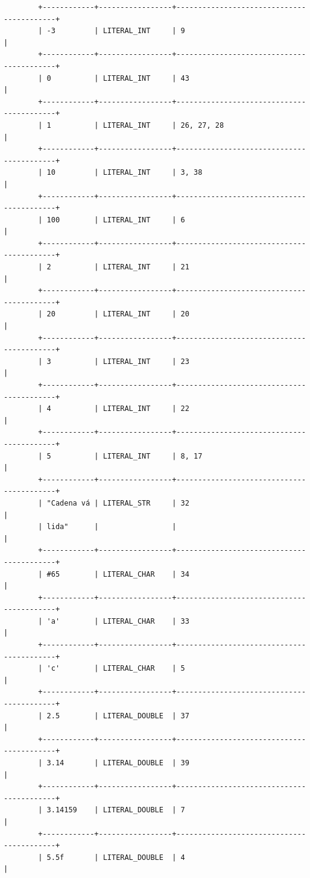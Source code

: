\documentclass[a4paper,12pt]{article}
\begin{document}
\begin{flushleft}
\begin{verbatim}
		+------------+-----------------+------------------------------------------+
		| -3         | LITERAL_INT     | 9                                        |
		+------------+-----------------+------------------------------------------+
		| 0          | LITERAL_INT     | 43                                       |
		+------------+-----------------+------------------------------------------+
		| 1          | LITERAL_INT     | 26, 27, 28                               |
		+------------+-----------------+------------------------------------------+
		| 10         | LITERAL_INT     | 3, 38                                    |
		+------------+-----------------+------------------------------------------+
		| 100        | LITERAL_INT     | 6                                        |
		+------------+-----------------+------------------------------------------+
		| 2          | LITERAL_INT     | 21                                       |
		+------------+-----------------+------------------------------------------+
		| 20         | LITERAL_INT     | 20                                       |
		+------------+-----------------+------------------------------------------+
		| 3          | LITERAL_INT     | 23                                       |
		+------------+-----------------+------------------------------------------+
		| 4          | LITERAL_INT     | 22                                       |
		+------------+-----------------+------------------------------------------+
		| 5          | LITERAL_INT     | 8, 17                                    |
		+------------+-----------------+------------------------------------------+
		| "Cadena vá | LITERAL_STR     | 32                                       |
		| lida"      |                 |                                          |
		+------------+-----------------+------------------------------------------+
		| #65        | LITERAL_CHAR    | 34                                       |
		+------------+-----------------+------------------------------------------+
		| 'a'        | LITERAL_CHAR    | 33                                       |
		+------------+-----------------+------------------------------------------+
		| 'c'        | LITERAL_CHAR    | 5                                        |
		+------------+-----------------+------------------------------------------+
		| 2.5        | LITERAL_DOUBLE  | 37                                       |
		+------------+-----------------+------------------------------------------+
		| 3.14       | LITERAL_DOUBLE  | 39                                       |
		+------------+-----------------+------------------------------------------+
		| 3.14159    | LITERAL_DOUBLE  | 7                                        |
		+------------+-----------------+------------------------------------------+
		| 5.5f       | LITERAL_DOUBLE  | 4                                        |
	\end{verbatim}
\end{flushleft}
\end{document}
